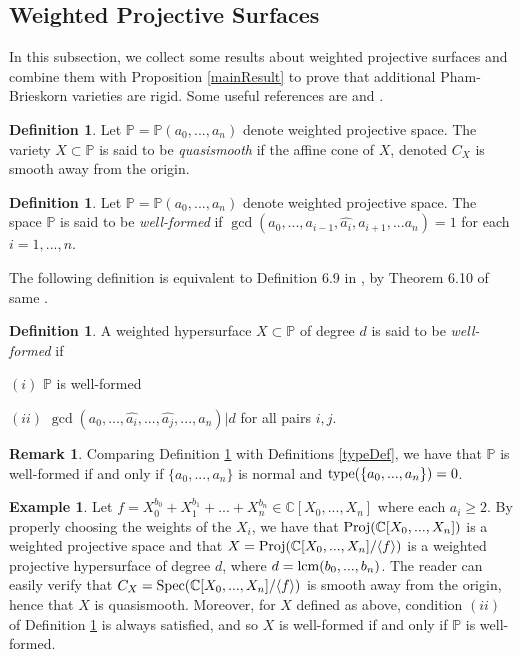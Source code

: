 \documentclass[12pt]{amsart}
\theoremstyle{plain}
\theoremstyle{definition}
\newtheorem{definition}[subsection]{Definition}
\newtheorem{example}[subsection]{Example}
\newtheorem{remark}[subsection]{Remark}
\newcommand{\Spec}{		\operatorname{{\rm Spec}}}
\newcommand{\Proj}{		\operatorname{{\rm Proj}}}
\newcommand{\lcm}{		\operatorname{{\rm lcm}}}
\newcommand{\type}{		\operatorname{{\rm type}}}
\newcommand{\lb}{\langle}
\newcommand{\rb}{\rangle}
\newcommand{\Comp}{\ensuremath{\mathbb{C}}}
\newcommand{\proj}{\ensuremath{\mathbb{P}}}
\begin{document}
\subsection{Weighted Projective Surfaces} 
		

In this subsection, we collect some results about weighted projective surfaces and combine them with Proposition \ref{mainResult} to prove that additional Pham-Brieskorn varieties are rigid. Some useful references are \cite{iano-fletcher_2000} and \cite{dolgachev}.	

\begin{definition}
	Let $\proj = \proj(a_0, ..., a_n)$ denote weighted projective space. The variety $X \subset \proj$ is said to be \textit{quasismooth} if the affine cone of $X$, denoted $C_X$ is smooth away from the origin. 
\end{definition}

\begin{definition} \label{wellformed1} Let $\proj = \proj(a_0, ..., a_n)$ denote weighted projective space. The space $\proj$ is said to be \textit{well-formed} if $\gcd(a_0,...,a_{i-1}, \hat{a_i}, a_{i+1}, ... a_n) = 1$ for each $i = 1,...,n$. 
\end{definition}

The following definition is equivalent to Definition 6.9 in \cite{iano-fletcher_2000}, by Theorem 6.10 of same \cite{iano-fletcher_2000}.
\begin{definition}	\label{wellformed2}
A weighted hypersurface $X \subset \proj$ of degree $d$ is said to be \textit{well-formed} if 
	
	$(i)$ $\proj$ is well-formed 
	
	$(ii)$ $\gcd(a_0, ...,\hat{a_i},...,\hat{a_j},...,a_n) | d$ for all pairs $i,j$.  
\end{definition}

\begin{remark}
	Comparing Definition \ref{wellformed1} with Definitions \ref{typeDef}, we have that $\proj$ is well-formed if and only if $\{a_0,..., a_n\}$ is normal and $\type(\{a_0,..., a_n\}) = 0$. 
\end{remark}

\begin{example}\label{weightedProjExample}
Let $f = X_0^{b_0} + X_1^{b_1} + ... + X_n^{b_n} \in \Comp[X_0, ..., X_n]$ where each $a_i \geq 2$. By properly choosing the weights of the $X_i$, we have that $\Proj(\Comp[X_0, ..., X_n])$ is a weighted projective space and that $X = \Proj(\Comp[X_0, ..., X_n] / \lb f \rb)$ is a weighted projective hypersurface of degree $d$, where $d = \lcm(b_0,...,b_n)$. The reader can easily verify that $C_X = \Spec(\Comp[X_0, ..., X_n] / \lb f \rb)$ is smooth away from the origin, hence that $X$ is quasismooth. Moreover, for $X$ defined as above, condition $(ii)$ of Definition \ref{wellformed2} is always satisfied, and so $X$ is well-formed if and only if $\proj$ is well-formed.
\end{example}
\end{document}
